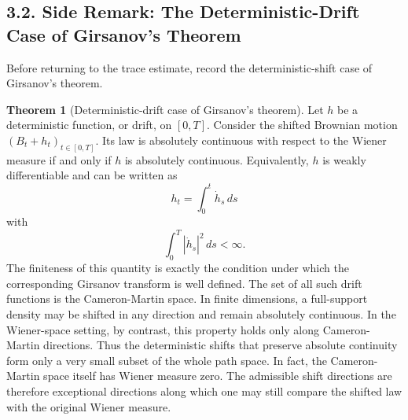 \documentclass[11pt]{article}
\theoremstyle{definition}
\newtheorem{theorem}{Theorem}
\theoremstyle{remark}
\begin{document}
\subsection*{3.2. Side Remark: The Deterministic-Drift Case of Girsanov's Theorem}
Before returning to the trace estimate, record the deterministic-shift case of Girsanov's theorem.

\begin{theorem}[Deterministic-drift case of Girsanov's theorem]
Let \(h\) be a deterministic function, or drift, on \([0,T]\). Consider the shifted Brownian motion \((B_t+h_t)_{t\in[0,T]}\). Its law is absolutely continuous with respect to the Wiener measure if and only if \(h\) is absolutely continuous. Equivalently, \(h\) is weakly differentiable and can be written as
\[
h_t=\int_0^t \dot h_s\,ds
\]
with
\[
\int_0^T |\dot h_s|^2\,ds<\infty.
\]
The finiteness of this quantity is exactly the condition under which the corresponding Girsanov transform is well defined. The set of all such drift functions is the Cameron-Martin space.
In finite dimensions, a full-support density may be shifted in any direction and remain absolutely continuous. In the Wiener-space setting, by contrast, this property holds only along Cameron-Martin directions. Thus the deterministic shifts that preserve absolute continuity form only a very small subset of the whole path space. In fact, the Cameron-Martin space itself has Wiener measure zero. The admissible shift directions are therefore exceptional directions along which one may still compare the shifted law with the original Wiener measure.
\end{theorem}
\end{document}
